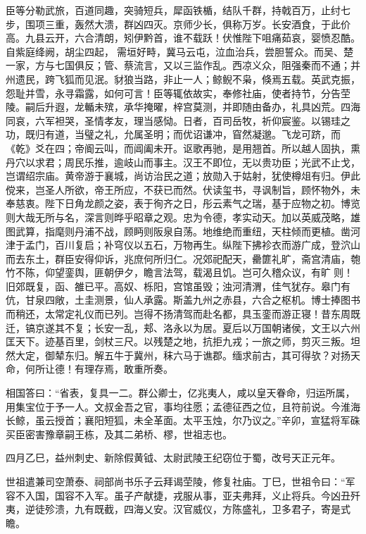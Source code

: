 \documentclass[12pt,UTF8]{ctexbook}
\begin{document}
臣等分勒武旅，百道同趣，突骑短兵，犀函铁楯，结队千群，持戟百万，止纣七步，围项三重，轰然大溃，群凶四灭。京师少长，俱称万岁。长安酒食，于此价高。九县云开，六合清朗，矧伊黔首，谁不载跃！伏惟陛下咀痛茹哀，婴愤忍酷。自紫庭绛阙，胡尘四起，需垣好畤，冀马云屯，泣血治兵，尝胆誓众。而吴、楚一家，方与七国俱反；管、蔡流言，又以三监作乱。西凉义众，阻强秦而不通；并州遗民，跨飞狐而见泯。豺狼当路，非止一人；鲸鲵不枭，倏焉五载。英武克振，怨耻并雪，永寻霜露，如何可言！臣等辄依故实，奉修社庙，使者持节，分告茔陵。嗣后升遐，龙輴未殡，承华掩曜，梓宫莫测，并即随由备办，礼具凶荒。四海同哀，六军袒哭，圣情孝友，理当感恸。日者，百司岳牧，祈仰宸鉴。以锡珪之功，既归有道，当璧之礼，允属圣明；而优诏谦冲，窅然凝邈。飞龙可跻，而《乾》爻在四；帝阍云叫，而阊阖未开。讴歌再驰，是用翘首。所以越人固执，熏丹穴以求君；周民乐推，逾岐山而事主。汉王不即位，无以贵功臣；光武不止戈，岂谓绍宗庙。黄帝游于襄城，尚访治民之道；放勋入于姑射，犹使樽俎有归。伊此傥来，岂圣人所欲，帝王所应，不获已而然。伏读玺书，寻讽制旨，顾怀物外，未奉慈衷。陛下日角龙颜之姿，表于徇齐之日，彤云素气之瑞，基于应物之初。博览则大哉无所与名，深言则晔乎昭章之观。忠为令德，孝实动天。加以英威茂略，雄图武算，指麾则丹浦不战，顾眄则阪泉自荡。地维绝而重纽，天柱倾而更植。凿河津于孟门，百川复启；补穹仪以五石，万物再生。纵陛下拂袗衣而游广成，登泬山而去东土，群臣安得仰诉，兆庶何所归仁。况郊祀配天，罍篚礼旷，斋宫清庙，匏竹不陈，仰望銮舆，匪朝伊夕，瞻言法驾，载渴且饥。岂可久稽众议，有旷则！旧郊既复，函、雒已平。高奴、栎阳，宫馆虽毁；浊河清渭，佳气犹存。皋门有伉，甘泉四敞，土圭测景，仙人承露。斯盖九州之赤县，六合之枢机。博士捧图书而稍还，太常定礼仪而已列。岂得不扬清驾而赴名都，具玉銮而游正寝！昔东周既迁，镐京遂其不复；长安一乱，郏、洛永以为居。夏后以万国朝诸侯，文王以六州匡天下。迹基百里，剑杖三尺。以残楚之地，抗拒九戎；一旅之师，剪灭三叛。坦然大定，御辇东归。解五牛于冀州，秣六马于谯郡。缅求前古，其可得欤？对扬天命，何所让德！有理存焉，敢重所奏。

相国答曰：“省表，复具一二。群公卿士，亿兆夷人，咸以皇天眷命，归运所属，用集宝位于予一人。文叔金吾之官，事均往愿；孟德征西之位，且符前说。今淮海长鲸，虽云授首；襄阳短狐，未全革面。太平玉烛，尔乃议之。”辛卯，宣猛将军硃买臣密害豫章嗣王栋，及其二弟桥、樛，世祖志也。

四月乙巳，益州刺史、新除假黄钺、太尉武陵王纪窃位于蜀，改号天正元年。

世祖遣兼司空萧泰、祠部尚书乐子云拜谒茔陵，修复社庙。丁巳，世祖令曰：“军容不入国，国容不入军。虽子产献捷，戎服从事，亚夫弗拜，义止将兵。今凶丑歼夷，逆徒殄溃，九有既截，四海乂安。汉官威仪，方陈盛礼，卫多君子，寄是式瞻。
\end{document}
